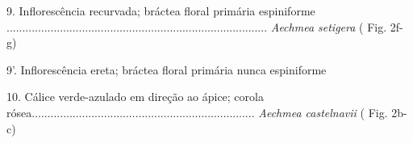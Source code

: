 \begin{customList1}
\begin{customList1}
\begin{customList1}
\begin{customList1}
\begin{customList1}
\begin{customList1}
\item \par{}9.\allowbreak{} Inflorescência recurvada; bráctea floral primária espiniforme .\allowbreak{}.\allowbreak{}.\allowbreak{}.\allowbreak{}.\allowbreak{}.\allowbreak{}.\allowbreak{}.\allowbreak{}.\allowbreak{}.\allowbreak{}.\allowbreak{}.\allowbreak{}.\allowbreak{}.\allowbreak{}.\allowbreak{}.\allowbreak{}.\allowbreak{}.\allowbreak{}.\allowbreak{}.\allowbreak{}.\allowbreak{}.\allowbreak{}.\allowbreak{}.\allowbreak{}.\allowbreak{}.\allowbreak{}.\allowbreak{}.\allowbreak{}.\allowbreak{}.\allowbreak{}.\allowbreak{}.\allowbreak{}.\allowbreak{}.\allowbreak{}.\allowbreak{}.\allowbreak{}.\allowbreak{}.\allowbreak{}.\allowbreak{}.\allowbreak{}.\allowbreak{}.\allowbreak{}.\allowbreak{}.\allowbreak{}.\allowbreak{}.\allowbreak{}.\allowbreak{}.\allowbreak{}.\allowbreak{}.\allowbreak{}.\allowbreak{}.\allowbreak{}.\allowbreak{}.\allowbreak{}.\allowbreak{}.\allowbreak{}.\allowbreak{}.\allowbreak{}.\allowbreak{}.\allowbreak{}.\allowbreak{}.\allowbreak{}.\allowbreak{}.\allowbreak{}.\allowbreak{}.\allowbreak{}.\allowbreak{}.\allowbreak{}.\allowbreak{}.\allowbreak{}.\allowbreak{}.\allowbreak{}.\allowbreak{}.\allowbreak{}.\allowbreak{}.\allowbreak{}.\allowbreak{}.\allowbreak{}.\allowbreak{}.\allowbreak{}.\allowbreak{}.\allowbreak{}.\allowbreak{} \textit{Aechmea setigera} (\allowbreak{} Fig.\allowbreak{} 2f-\allowbreak{}g)\allowbreak{}
\item \par{}9'.\allowbreak{} Inflorescência ereta; bráctea floral primária nunca espiniforme
\begin{customList1}
\item \par{}10.\allowbreak{} Cálice verde-\allowbreak{}azulado em direção ao ápice; corola rósea.\allowbreak{}.\allowbreak{}.\allowbreak{}.\allowbreak{}.\allowbreak{}.\allowbreak{}.\allowbreak{}.\allowbreak{}.\allowbreak{}.\allowbreak{}.\allowbreak{}.\allowbreak{}.\allowbreak{}.\allowbreak{}.\allowbreak{}.\allowbreak{}.\allowbreak{}.\allowbreak{}.\allowbreak{}.\allowbreak{}.\allowbreak{}.\allowbreak{}.\allowbreak{}.\allowbreak{}.\allowbreak{}.\allowbreak{}.\allowbreak{}.\allowbreak{}.\allowbreak{}.\allowbreak{}.\allowbreak{}.\allowbreak{}.\allowbreak{}.\allowbreak{}.\allowbreak{}.\allowbreak{}.\allowbreak{}.\allowbreak{}.\allowbreak{}.\allowbreak{}.\allowbreak{}.\allowbreak{}.\allowbreak{}.\allowbreak{}.\allowbreak{}.\allowbreak{}.\allowbreak{}.\allowbreak{}.\allowbreak{}.\allowbreak{}.\allowbreak{}.\allowbreak{}.\allowbreak{}.\allowbreak{}.\allowbreak{}.\allowbreak{}.\allowbreak{}.\allowbreak{}.\allowbreak{}.\allowbreak{}.\allowbreak{}.\allowbreak{}.\allowbreak{}.\allowbreak{}.\allowbreak{}.\allowbreak{}.\allowbreak{}.\allowbreak{}.\allowbreak{}.\allowbreak{}.\allowbreak{} \textit{Aechmea castelnavii} (\allowbreak{} Fig.\allowbreak{} 2b-\allowbreak{}c)\allowbreak{}

\end{customList1}
\end{customList1}
\end{customList1}
\end{customList1}
\end{customList1}
\end{customList1}
\end{customList1}
